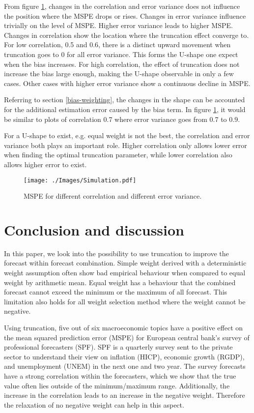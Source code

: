 \documentclass[11pt]{article}
\begin{document}
From figure \ref{fig: simulation}, changes in the correlation and error variance does not influence the position where the MSPE drops or rises. Changes in error variance influence trivially on the level of MSPE. Higher error variance leads to higher MSPE. Changes in correlation show the location where the truncation effect converge to. For low correlation, 0.5 and 0.6, there is a distinct upward movement when truncation goes to 0 for all error variance. This forms the U-shape one expect when the bias increases. For high correlation, the effect of truncation does not increase the bias large enough, making the U-shape observable in only a few cases. Other cases with higher error variance show a continuous decline in MSPE. 

Referring to section \ref{bias-weighting}, the changes in the shape can be accounted for the additional estimation error caused by the bias term. In figure \ref{fig: simulation}, it would be similar to plots of correlation 0.7 where error variance goes from 0.7 to 0.9.

For a U-shape to exist, e.g. equal weight is not the best, the correlation and error variance both plays an important role. Higher correlation only allows lower error when finding the optimal truncation parameter, while lower correlation also allows higher error to exist.

\begin{figure}[!h]
	\centering
	\texttt{[image: ./Images/Simulation.pdf]}
	\caption{MSPE for different correlation and different error variance.}\label{fig: simulation}
\end{figure}

\section{Conclusion and discussion}\label{conclusion}
In this paper, we look into the possibility to use truncation to improve the forecast within forecast combination. Simple weight derived with a deterministic weight assumption often show bad empirical behaviour when compared to equal weight by arithmetic mean. Equal weight has a behaviour that the combined forecast cannot exceed the minimum or the maximum of all forecast. This limitation also holds for all weight selection method where the weight cannot be negative. 

Using truncation, five out of six macroeconomic topics have a positive effect on the mean squared prediction error (MSPE) for European central bank's survey of professional forecasters (SPF). SPF is a quarterly survey sent to the private sector to understand their view on inflation (HICP), economic growth (RGDP), and unemployment (UNEM) in the next one and two year. The survey forecasts have a strong correlation within the forecasters, which we show that the true value often lies outside of the minimum/maximum range. Additionally, the increase in the correlation leads to an increase in the negative weight. Therefore the relaxation of no negative weight can help in this aspect.
\end{document}

